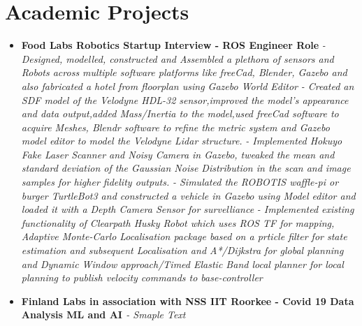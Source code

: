 \documentclass[a4paper,12pt]{article}
\begin{document}
\section*{Academic Projects}
\begin{itemize}
    \item{\textbf{\large{Food Labs Robotics Startup Interview - ROS Engineer Role}}
    \newline
    \textit{- Designed, modelled, constructed and
    Assembled a plethora of sensors and Robots across multiple software platforms like
    freeCad, Blender, Gazebo and also fabricated a hotel from floorplan using Gazebo World Editor}
    \newline
    \textit{- Created an SDF model of the Velodyne HDL-32 sensor,improved the model's appearance and data output,added Mass/Inertia to the model,used freeCad software to acquire Meshes, Blendr software to refine the metric system and Gazebo model editor to model the Velodyne Lidar structure.}
    \newline
    \textit{- Implemented Hokuyo Fake Laser Scanner and Noisy Camera in Gazebo, tweaked the mean and standard deviation of the Gaussian Noise Distribution in the scan and image samples for higher fidelity outputs.}
    \newline
    \textit{- Simulated the ROBOTIS waffle-pi or burger TurtleBot3 and constructed a vehicle in Gazebo using Model editor and loaded it with a Depth Camera Sensor for survelliance}
    \newline
    \textit{- Implemented existing functionality of Clearpath Husky Robot which uses ROS TF for mapping, Adaptive Monte-Carlo Localisation package based on a prticle filter for state estimation and subsequent Localisation and A*/Dijkstra for global planning and Dynamic Window approach/Timed Elastic Band local planner for local planning to publish velocity commands to base-controller}}
    \newline
    \item{\textbf{\large{Finland Labs in association with NSS IIT Roorkee - Covid 19 Data Analysis ML and AI }}
    \newline
    \textit{- Smaple Text}}
\end{itemize}
\end{document}

